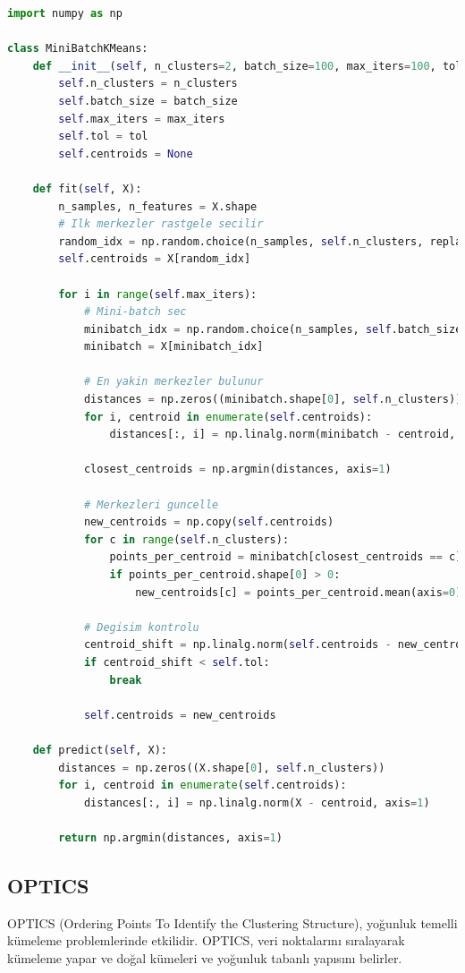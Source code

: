 \begin{lstlisting}[language=Python, caption=Scikit-learn'de MiniBatchKMeans.]
import numpy as np

class MiniBatchKMeans:
    def __init__(self, n_clusters=2, batch_size=100, max_iters=100, tol=1e-4):
        self.n_clusters = n_clusters
        self.batch_size = batch_size
        self.max_iters = max_iters
        self.tol = tol
        self.centroids = None

    def fit(self, X):
        n_samples, n_features = X.shape
        # Ilk merkezler rastgele secilir
        random_idx = np.random.choice(n_samples, self.n_clusters, replace=False)
        self.centroids = X[random_idx]

        for i in range(self.max_iters):
            # Mini-batch sec
            minibatch_idx = np.random.choice(n_samples, self.batch_size, replace=False)
            minibatch = X[minibatch_idx]

            # En yakin merkezler bulunur
            distances = np.zeros((minibatch.shape[0], self.n_clusters))
            for i, centroid in enumerate(self.centroids):
                distances[:, i] = np.linalg.norm(minibatch - centroid, axis=1)

            closest_centroids = np.argmin(distances, axis=1)

            # Merkezleri guncelle
            new_centroids = np.copy(self.centroids)
            for c in range(self.n_clusters):
                points_per_centroid = minibatch[closest_centroids == c]
                if points_per_centroid.shape[0] > 0:
                    new_centroids[c] = points_per_centroid.mean(axis=0)

            # Degisim kontrolu
            centroid_shift = np.linalg.norm(self.centroids - new_centroids, axis=None)
            if centroid_shift < self.tol:
                break

            self.centroids = new_centroids

    def predict(self, X):
        distances = np.zeros((X.shape[0], self.n_clusters))
        for i, centroid in enumerate(self.centroids):
            distances[:, i] = np.linalg.norm(X - centroid, axis=1)

        return np.argmin(distances, axis=1)
\end{lstlisting}

\newpage

\subsection{OPTICS}
OPTICS (Ordering Points To Identify the Clustering Structure), yoğunluk temelli kümeleme problemlerinde etkilidir. OPTICS, veri noktalarını sıralayarak kümeleme yapar ve doğal kümeleri ve yoğunluk tabanlı yapısını belirler.

